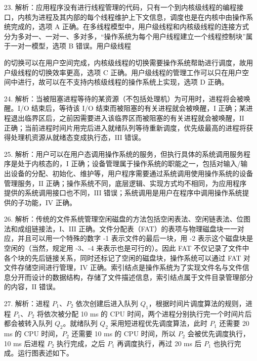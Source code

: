 \documentclass[UTF8,11pt]{ctexart}
\begin{document}
23. 解析：应用程序没有进行线程管理的代码，只有一个到内核级线程的编程接口，内核为进程及其内部的每个线程维护上下文信息，调度也是在内核中由操作系统完成的，选项 A 正确。在多线程模型中，用户级线程和内核级线程的连接方式分为多对一、一对一、多对多，“操作系统为每个用户线程建立一个线程控制块”属于一对一模型，选项 B 错误。用户级线程


的切换可以在用户空间完成，内核级线程的切换需要操作系统帮助进行调度，故用户级线程的切换效率更高，选项 C 正确。用户级线程的管理工作可以只在用户空间中进行，故可以在不支持内核级线程的操作系统上实现，选项 D 正确。


24. 解析：当被阻塞进程等待的某资源（不包括处理机）为可用时，进程将会被唤醒。I/O 结束后，等待该 I/O 结束而被阻塞的有关进程就会被唤醒，\(\displaystyle \mathrm{I}\) 正确；某进程退出临界区后，之前因需要进入该临界区而被阻塞的有关进程就会被唤醒，\(\displaystyle \mathrm{II}\) 正确；当前进程时间片用完后进入就绪队列等待重新调度，优先级最高的进程将获得处理机资源从就绪态变成执行态，\(\displaystyle \mathrm{III}\) 错误。


25. 解析：用户可以在用户态调用操作系统的服务，但执行具体的系统调用服务程序是处于内核态的，\(\displaystyle \mathrm{I}\) 正确；设备管理属于操作系统的职能之一，包括对输入/输出设备的分配、初始化、维护等，用户程序需要通过系统调用使用操作系统的设备管理服务，\(\displaystyle \mathrm{II}\) 正确；操作系统不同，底层逻辑、实现方式均不相同，为应用程序提供的系统调用接口也不同，\(\displaystyle \mathrm{III}\) 错误；系统调用是用户在程序中调用操作系统提供的子功能，\(\displaystyle \mathrm{IV}\) 正确。


26. 解析：传统的文件系统管理空闲磁盘的方法包括空闲表法、空闲链表法、位图法和成组链接法，\(\displaystyle \mathrm{I}\)、\(\displaystyle \mathrm{III}\) 正确。文件分配表（FAT）的表项与物理磁盘块一一对应，并且可以用一个特殊的数字 -1 表示文件的最后一块，用 -2 表示这个磁盘块是空闲的（当然，规定用 -3、-4 来表示也是可行的）。因此 FAT 不仅记录了文件中各个块的先后链接关系，同时还标记了空闲的磁盘块，操作系统可以通过 FAT 对文件存储空间进行管理，\(\displaystyle \mathrm{IV}\) 正确。索引结点是操作系统为了实现文件名与文件信息分开而设计的数据结构，存储了文件描述信息，索引结点属于文件目录管理部分的内容，\(\displaystyle \mathrm{II}\) 错误。


27. 解析：进程 \(\displaystyle P_1\)、\(\displaystyle P_2\) 依次创建后进入队列 \(\displaystyle Q_1\)，根据时间片调度算法的规则，进程 \(\displaystyle P_1\)、\(\displaystyle P_2\) 将依次被分配 10 ms 的 CPU 时间，两个进程分别执行完一个时间片后都会被转入队列 \(\displaystyle Q_2\)。就绪队列 \(\displaystyle Q_2\) 采用短进程优先调度算法，此时 \(\displaystyle P_1\) 还需要 20 ms 的 CPU 时间，\(\displaystyle P_2\) 还需要 10 ms 的 CPU 时间，所以 \(\displaystyle P_2\) 会被优先调度执行，10 ms 后进程 \(\displaystyle P_2\) 执行完成，之后 \(\displaystyle P_1\) 再调度执行，再过 20 ms 后 \(\displaystyle P_1\) 也执行完成。运行图表述如下。
\end{document}
